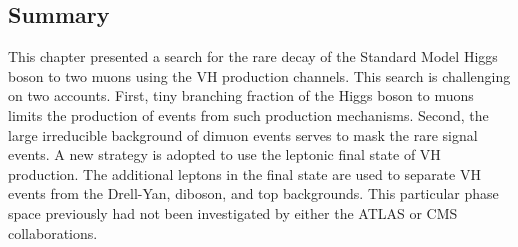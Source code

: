 
\subsection{Summary}

This chapter presented a search for the rare decay of the Standard Model Higgs boson to two muons using the VH production channels.
This search is challenging on two accounts.
First, tiny branching fraction of the Higgs boson to muons limits the production of events from such production mechanisms.
Second, the large irreducible background of dimuon events serves to mask the rare signal events.
A new strategy is adopted to use the leptonic final state of VH production.
The additional leptons in the final state are used to separate VH events from the Drell-Yan, diboson, and top backgrounds.
This particular phase space previously had not been investigated by either the ATLAS or CMS collaborations.

